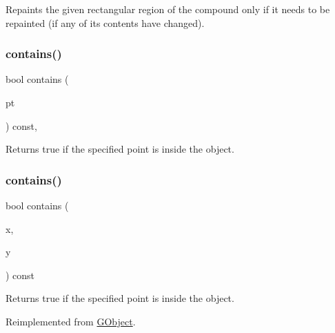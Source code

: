 Repaints the given rectangular region of the compound only if it needs to be repainted (if any of its contents have changed). 

\mbox{\label{classGObject_a1dbc9dafaae51958112dbe1267a1f547}} 
\subsubsection{\texorpdfstring{contains()}{contains()}\hspace{0.1cm}{\footnotesize\ttfamily [1/2]}}
{\footnotesize\ttfamily bool contains (\begin{DoxyParamCaption}\item[{const \mbox{\hyperlink{classGPoint}{G\+Point}} \&}]{pt }\end{DoxyParamCaption}) const\hspace{0.3cm}{\ttfamily [virtual]}, {\ttfamily [inherited]}}



Returns {\ttfamily true} if the specified point is inside the object. 

\mbox{\label{classGCompound_aa095a031ab22c150d2d75fdda1c3c8f5}} 
\subsubsection{\texorpdfstring{contains()}{contains()}\hspace{0.1cm}{\footnotesize\ttfamily [2/2]}}
{\footnotesize\ttfamily bool contains (\begin{DoxyParamCaption}\item[{double}]{x,  }\item[{double}]{y }\end{DoxyParamCaption}) const\hspace{0.3cm}{\ttfamily [virtual]}}



Returns {\ttfamily true} if the specified point is inside the object. 



Reimplemented from \mbox{\hyperlink{classGObject_abb6a5d7c03e6eaaae97264c4799ce7c3}{G\+Object}}.

\mbox{\label{classGObject_a0d41183bf6b08de66fe3907551aab0d7}} 
